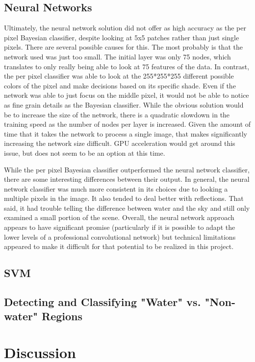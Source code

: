 \documentclass[12pt]{article}
\begin{document}
	\subsection{Neural Networks}
	Ultimately, the neural network solution did not offer as high accuracy as the per pixel Bayesian classifier, despite looking at 5x5 patches rather than just single pixels.  There are several possible causes for this.  The most probably is that the network used was just too small.  The initial layer was only 75 nodes, which translates to only really being able to look at 75 features of the data.  In contrast, the per pixel classifier was able to look at the 255*255*255 different possible colors of the pixel and make decisions based on its specific shade.  Even if the network was able to just focus on the middle pixel, it would not be able to notice as fine grain details as the Bayesian classifier.  While the obvious solution would be to increase the size of the network, there is a quadratic slowdown in the training speed as the number of nodes per layer is increased.  Given the amount of time that it takes the network to process a single image, that makes significantly increasing the network size difficult.  GPU acceleration would get around this issue, but does not seem to be an option at this time.

	While the per pixel Bayesian classifier outperformed the neural network classifier, there are some interesting differences between their output.  In general, the neural network classifier was much more consistent in its choices due to looking a multiple pixels in the image.  It also tended to deal better with reflections.  That said, it had trouble telling the difference between water and the sky and still only examined a small portion of the scene.  Overall, the neural network approach appears to have significant promise (particularly if it is possible to adapt the lower levels of a professional convolutional network) but technical limitations appeared to make it difficult for that potential to be realized in this project.

	\subsection{SVM}
	\subsection{Detecting and Classifying "Water" vs. "Non-water" Regions}

\section{Discussion}


   
\end{document}
